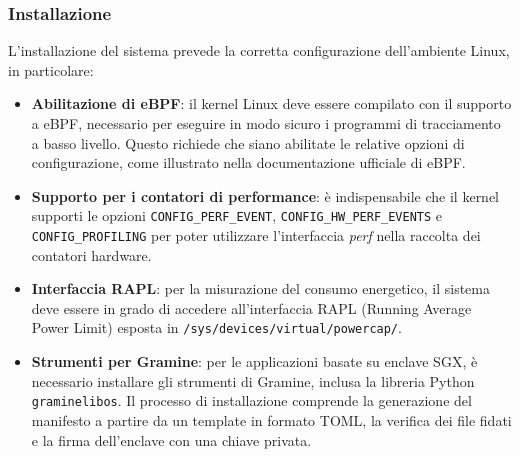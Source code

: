 \documentclass{article}
\begin{document}
\subsubsection{Installazione}
L'installazione del sistema prevede la corretta configurazione dell'ambiente Linux, in particolare:
\begin{itemize}
  \item \textbf{Abilitazione di eBPF}: il kernel Linux deve essere compilato con il supporto a eBPF, necessario per eseguire in modo sicuro i programmi di tracciamento a basso livello. Questo richiede che siano abilitate le relative opzioni di configurazione, come illustrato nella documentazione ufficiale di eBPF.
  \item \textbf{Supporto per i contatori di performance}: è indispensabile che il kernel supporti le opzioni \texttt{CONFIG\_PERF\_EVENT}, \texttt{CONFIG\_HW\_PERF\_EVENTS} e \texttt{CONFIG\_PROFILING} per poter utilizzare l'interfaccia \textit{perf} nella raccolta dei contatori hardware.
  \item \textbf{Interfaccia RAPL}: per la misurazione del consumo energetico, il sistema deve essere in grado di accedere all'interfaccia RAPL (Running Average Power Limit) esposta in \texttt{/sys/devices/virtual/powercap/}.
  \item \textbf{Strumenti per Gramine}: per le applicazioni basate su enclave SGX, è necessario installare gli strumenti di Gramine, inclusa la libreria Python \texttt{graminelibos}. Il processo di installazione comprende la generazione del manifesto a partire da un template in formato TOML, la verifica dei file fidati e la firma dell'enclave con una chiave privata.
\end{itemize}
\end{document}
